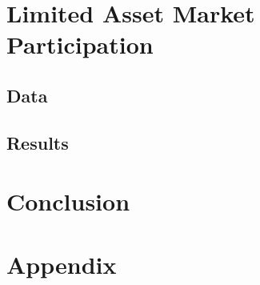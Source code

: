 \documentclass{thesis}
\begin{document}
\section{Limited Asset Market Participation}
\subsection{Data}
\subsection{Results}

\section{Conclusion}

\section{Appendix}

\newpage
\let\Section\section 
\def\section*#1{\Section{#1}}


\end{document}

